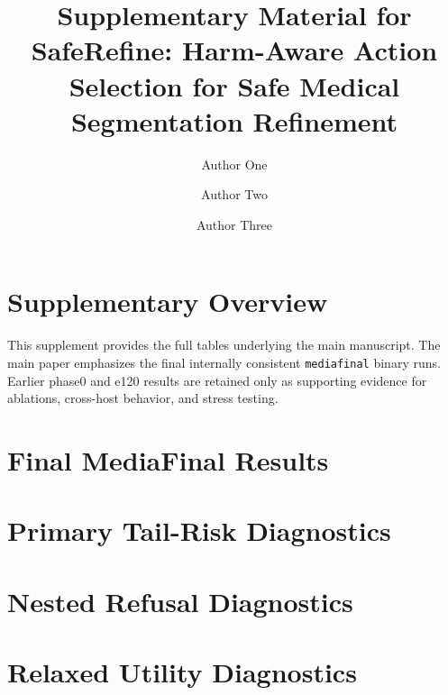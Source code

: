 \documentclass[preprint,12pt]{elsarticle}
\begin{document}
\begin{frontmatter}
\title{Supplementary Material for SafeRefine: Harm-Aware Action Selection for Safe Medical Segmentation Refinement}
\author[inst1]{Author One}
\author[inst1]{Author Two}
\author[inst1]{Author Three}
\address[inst1]{Institution, City, Country}
\end{frontmatter}

\section{Supplementary Overview}

This supplement provides the full tables underlying the main manuscript. The
main paper emphasizes the final internally consistent \texttt{mediafinal}
binary runs. Earlier phase0 and e120 results are retained only as supporting
evidence for ablations, cross-host behavior, and stress testing.

\section{Final MediaFinal Results}



\section{Primary Tail-Risk Diagnostics}









\section{Nested Refusal Diagnostics}





\section{Relaxed Utility Diagnostics}
\end{document}
